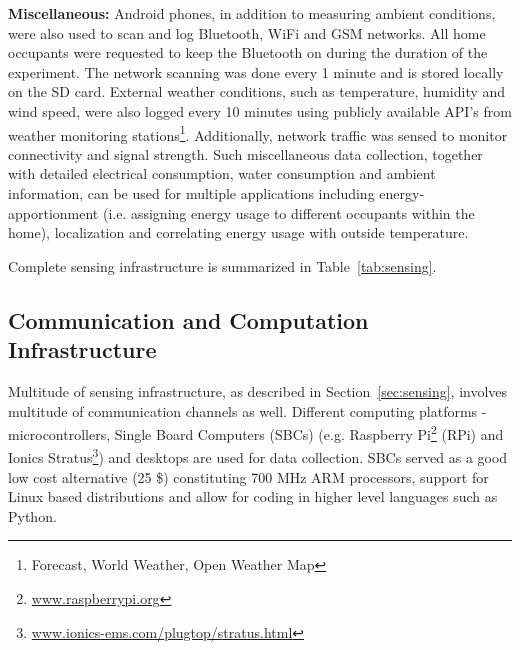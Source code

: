 \documentclass[10pt]{sensys-proc}
\newcommand{\secref}[1]{Section~\ref{#1}}
\newcommand{\tabref}[1]{Table~\ref{#1}}
\begin{document}
\noindent \textbf{Miscellaneous:} Android phones, in addition to measuring ambient conditions, were also used to scan and log Bluetooth, WiFi and GSM networks. All home occupants were requested to keep the Bluetooth on during the duration of the experiment. The network scanning was done every 1 minute and is stored locally on the SD card. External weather conditions, such as temperature, humidity and wind speed, were also logged every 10 minutes using publicly available API's from weather monitoring stations\footnote{Forecast, World Weather, Open Weather Map}.
Additionally, network traffic was sensed to monitor connectivity and signal strength. Such miscellaneous data collection, together with detailed electrical consumption, water consumption and ambient information, can be used for multiple applications including energy-apportionment (i.e. assigning energy usage to different occupants within the home), localization and correlating energy usage with outside temperature.

\noindent Complete sensing infrastructure is summarized in \tabref{tab:sensing}.




\subsection{Communication and Computation Infrastructure}
Multitude of sensing infrastructure, as described in \secref{sec:sensing}, involves multitude of communication channels as well. Different computing platforms - microcontrollers, Single Board Computers (SBCs) (e.g. Raspberry Pi\footnote{\url{www.raspberrypi.org}} (RPi) and Ionics Stratus\footnote{\url{www.ionics-ems.com/plugtop/stratus.html}}) and desktops are used for data collection.  
SBCs served as a good low cost alternative (25 \$) constituting 700 MHz ARM processors, support for Linux based distributions and allow for coding in higher level languages such as Python. %
\end{document}
